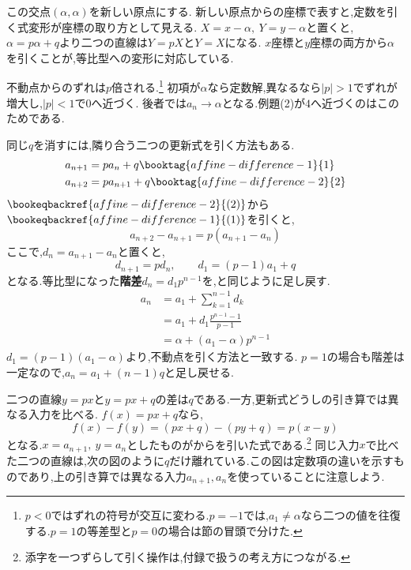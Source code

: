   この交点$(\alpha,\alpha)$を新しい原点にする.
  新しい原点からの座標で表すと,定数を引く式変形が座標の取り方として見える.
  $X=x-\alpha,\ Y=y-\alpha$と置くと,$\alpha=p\alpha+q$より二つの直線は$Y=pX$と$Y=X$になる.
  $x$座標と$y$座標の両方から$\alpha$を引くことが,等比型への変形に対応している.

  不動点からのずれは$p$倍される.\footnote{$p<0$ではずれの符号が交互に変わる.$p=-1$では,$a_1\ne\alpha$なら二つの値を往復する.$p=1$の等差型と$p=0$の場合は節の冒頭で分けた.}%
  初項が$\alpha$なら定数解,異なるなら$|p|>1$でずれが増大し,$|p|<1$で$0$へ近づく.
  後者では$a_n\to\alpha$となる.例題(2)が$4$へ近づくのはこのためである.

  同じ$q$を消すには,隣り合う二つの更新式を引く方法もある.
  \begin{align*}
    &a_{n+1}=pa_n+q \booktag{affine-difference-1}{1}\\
    &a_{n+2}=pa_{n+1}+q \booktag{affine-difference-2}{2}\\
  \end{align*}
  $\bookeqbackref{affine-difference-2}{(2)}$から$\bookeqbackref{affine-difference-1}{(1)}$を引くと,
  \[
    a_{n+2}-a_{n+1}=p(a_{n+1}-a_n)
  \]
  ここで,$d_n=a_{n+1}-a_n$と置くと,
  \[
    d_{n+1}=pd_n,\qquad d_1=(p-1)a_1+q
  \]
  となる.等比型になった\textbf{階差}$d_n=d_1p^{n-1}$を,と同じように足し戻す.
  \begin{align*}
    a_n&=a_1+\sum_{k=1}^{n-1}d_k\\
       &=a_1+d_1\frac{p^{n-1}-1}{p-1}\\
       &=\alpha+(a_1-\alpha)p^{n-1}
  \end{align*}
  $d_1=(p-1)(a_1-\alpha)$より,不動点を引く方法と一致する.
  $p=1$の場合も階差は一定なので,$a_n=a_1+(n-1)q$と足し戻せる.

  二つの直線$y=px$と$y=px+q$の差は$q$である.一方,更新式どうしの引き算では異なる入力を比べる.
  $f(x)=px+q$なら,
  \[
    f(x)-f(y)=(px+q)-(py+q)=p(x-y)
  \]
  となる.$x=a_{n+1},\ y=a_n$としたものがからを引いた式である.\footnote{添字を一つずらして引く操作は,付録で扱うの考え方につながる.}
  同じ入力$x$で比べた二つの直線は,次の図のように$q$だけ離れている.この図は定数項の違いを示すものであり,上の引き算では異なる入力$a_{n+1},a_n$を使っていることに注意しよう.

